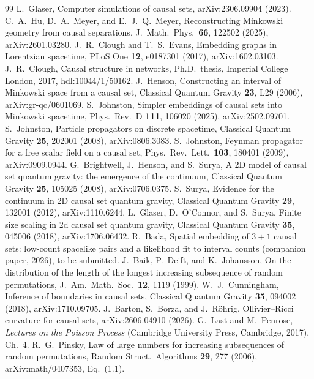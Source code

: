 \documentclass[prd,twocolumn,superscriptaddress,nofootinbib,amsmath,amssymb,floatfix]{revtex4-2}
\begin{document}
\begin{thebibliography}{99}
 L.~Glaser, Computer simulations of causal sets, arXiv:2306.09904 (2023).
 C.~A.~Hu, D.~A.~Meyer, and E.~J.~Q.~Meyer, Reconstructing Minkowski geometry from causal separations, J.\ Math.\ Phys.\ \textbf{66}, 122502 (2025), arXiv:2601.03280.
 J.~R.~Clough and T.~S.~Evans, Embedding graphs in Lorentzian spacetime, PLoS One \textbf{12}, e0187301 (2017), arXiv:1602.03103.
 J.~R.~Clough, Causal structure in networks, Ph.D.\ thesis, Imperial College London, 2017, hdl:10044/1/50162.
 J.~Henson, Constructing an interval of Minkowski space from a causal set, Classical Quantum Gravity \textbf{23}, L29 (2006), arXiv:gr-qc/0601069.
 S.~Johnston, Simpler embeddings of causal sets into Minkowski spacetime, Phys.\ Rev.\ D \textbf{111}, 106020 (2025), arXiv:2502.09701.
 S.~Johnston, Particle propagators on discrete spacetime, Classical Quantum Gravity \textbf{25}, 202001 (2008), arXiv:0806.3083.
 S.~Johnston, Feynman propagator for a free scalar field on a causal set, Phys.\ Rev.\ Lett.\ \textbf{103}, 180401 (2009), arXiv:0909.0944.
 G.~Brightwell, J.~Henson, and S.~Surya, A 2D model of causal set quantum gravity: the emergence of the continuum, Classical Quantum Gravity \textbf{25}, 105025 (2008), arXiv:0706.0375.
 S.~Surya, Evidence for the continuum in 2D causal set quantum gravity, Classical Quantum Gravity \textbf{29}, 132001 (2012), arXiv:1110.6244.
 L.~Glaser, D.~O'Connor, and S.~Surya, Finite size scaling in 2d causal set quantum gravity, Classical Quantum Gravity \textbf{35}, 045006 (2018), arXiv:1706.06432.
 R.~Bada, Spatial embedding of $3+1$ causal sets: low-count spacelike pairs and a likelihood fit to interval counts (companion paper, 2026), to be submitted.
 J.~Baik, P.~Deift, and K.~Johansson, On the distribution of the length of the longest increasing subsequence of random permutations, J.\ Am.\ Math.\ Soc.\ \textbf{12}, 1119 (1999).
 W.~J.~Cunningham, Inference of boundaries in causal sets, Classical Quantum Gravity \textbf{35}, 094002 (2018), arXiv:1710.09705.
 J.~Barton, S.~Borza, and J.~R\"ohrig, Ollivier--Ricci curvature for causal sets, arXiv:2606.04910 (2026).
 G.~Last and M.~Penrose, \emph{Lectures on the Poisson Process} (Cambridge University Press, Cambridge, 2017), Ch.~4.
 R.~G.~Pinsky, Law of large numbers for increasing subsequences of random permutations, Random Struct.\ Algorithms \textbf{29}, 277 (2006), arXiv:math/0407353, Eq.~(1.1).

\end{thebibliography}
\end{document}
